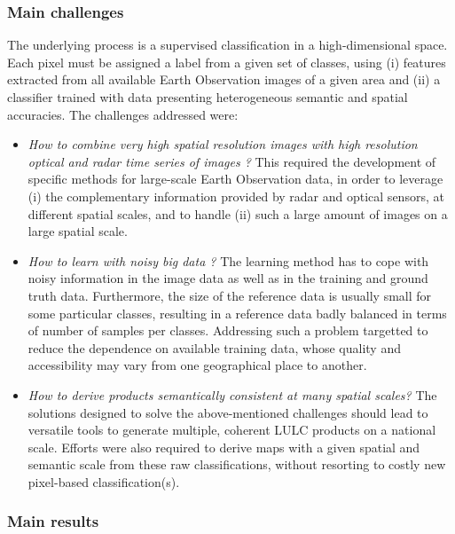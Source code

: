  \subsubsection*{Main challenges}
 The underlying process is a supervised classification in a high-dimensional space. Each pixel must be assigned a label from a given set of classes, using (i) features extracted from all available Earth Observation images of a given area and (ii) a classifier trained with data presenting heterogeneous semantic and spatial accuracies. The challenges addressed were: 

\begin{itemize}
\item \textit{How to combine very high spatial resolution images with high resolution optical and radar time series of images ?} This required the development of specific methods for large-scale Earth Observation data, in order to leverage (i) the complementary information provided by radar and optical sensors, at different spatial scales, and to handle (ii) such a large amount of images on a large spatial scale.
\item \textit{How to learn with noisy big data ?} The learning method has to cope with noisy information in the image data as well as in the training and ground truth data. Furthermore, the size of the reference data is usually small for some particular classes, resulting in a reference data badly balanced in terms of number of samples per classes. Addressing such a problem targetted to reduce the dependence on available training data, whose quality and accessibility may vary from one geographical place to another.
\item \textit{How to derive products semantically consistent at many spatial scales?} The solutions designed to solve the above-mentioned challenges should lead to versatile tools to generate multiple, coherent LULC products on a national scale. Efforts were also required to derive maps with a given spatial and semantic scale from these raw classifications, without resorting to costly new pixel-based classification(s).

\end{itemize}

\subsubsection*{Main results}

